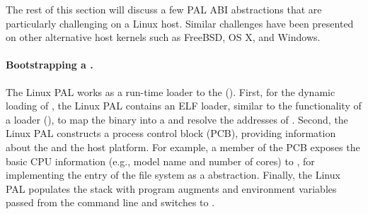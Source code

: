 

The rest of this section
will discuss a few PAL ABI abstractions that are particularly challenging on a Linux host.
Similar challenges have been presented %
on other alternative host kernels such as FreeBSD, OS X, and Windows.


\paragraph{Bootstrapping a \picoproc{}.}
The Linux PAL works as a run-time loader to the \graphene{} \libos{} (\thelibos{}). %
First, for the dynamic loading of \thelibos{},
the Linux PAL contains an ELF loader, similar to the functionality of a \libc{} loader (),
to map the \thelibos{} binary into a \picoproc{} and resolve the addresses of \hostapis{}.
Second, the Linux PAL constructs a process control block (PCB),
providing information
about the \picoproc{} and the host platform.
For example, a member of the PCB exposes the basic CPU information (e.g., model name and number of cores) to \thelibos{}, 
for implementing the  entry of the  file system
as a \libos{} abstraction.
Finally,
the Linux PAL populates the stack with program augments and environment variables passed from the command line and switches to \thelibos{}.



